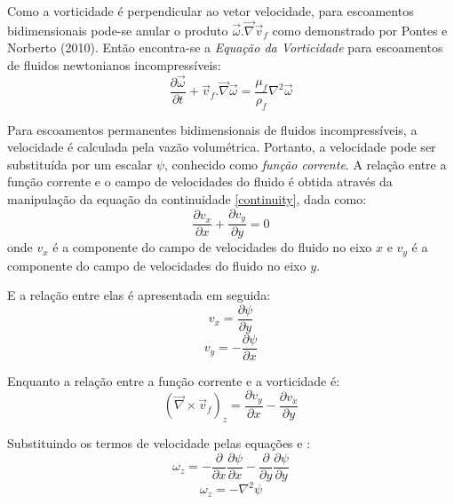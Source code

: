 Como a vorticidade é perpendicular ao vetor velocidade, para escoamentos bidimensionais pode-se anular o produto $\vec{\omega}.\vec{\nabla}\vec{v}_f$ como demonstrado por Pontes e Norberto (2010)\cite{pontes_norberto}.
Então encontra-se a \textit{Equação da Vorticidade} para escoamentos de fluidos newtonianos incompressíveis:
\begin{equation}
	\dfrac{\partial \vec{\omega}}{\partial t} +
	\vec{v}_f.\vec{\nabla}\vec{\omega} =
    \dfrac{\mu_f}{\rho_f} \nabla^2 \vec{\omega}
    \label{vorticity}
\end{equation}

Para escoamentos permanentes bidimensionais de fluidos incompressíveis, a velocidade é calculada pela vazão volumétrica.
Portanto, a velocidade pode ser substituída por um escalar $\psi$, conhecido como \textit{função corrente}.
A relação entre a função corrente e o campo de velocidades do fluido é obtida através da manipulação da equação da continuidade \eqref{continuity}, dada como:
\begin{equation}
	\dfrac{\partial v_x}{\partial x} +
	\dfrac{\partial v_y}{\partial y} =
	0
\end{equation}
onde $v_x$ é a componente do campo de velocidades do fluido no eixo $x$ e $v_y$ é a componente do campo de velocidades do fluido no eixo $y$.

E a relação entre elas é apresentada em seguida:
\begin{equation}
	v_x = \dfrac{\partial \psi}{\partial y}
	\label{corr_x}
\end{equation}
\begin{equation}
	v_y = -\dfrac{\partial \psi}{\partial x}
	\label{corr_y}
\end{equation}

Enquanto a relação entre a função corrente e a vorticidade é:
\begin{equation}
	(\vec{\nabla}\times\vec{v}_f)_z =
	\dfrac{\partial v_y}{\partial x} -
	\dfrac{\partial v_x}{\partial y}
\end{equation}

Substituindo os termos de velocidade pelas equações  e :
\begin{equation}
	\omega_z =
	-\dfrac{\partial}{\partial x}\dfrac{\partial \psi}{\partial x} -
	\dfrac{\partial}{\partial y}\dfrac{\partial \psi}{\partial y}
\end{equation}
\begin{equation}
	\omega_z =
	-\nabla^2\psi
	\label{corrente_vorticidade}
\end{equation}

